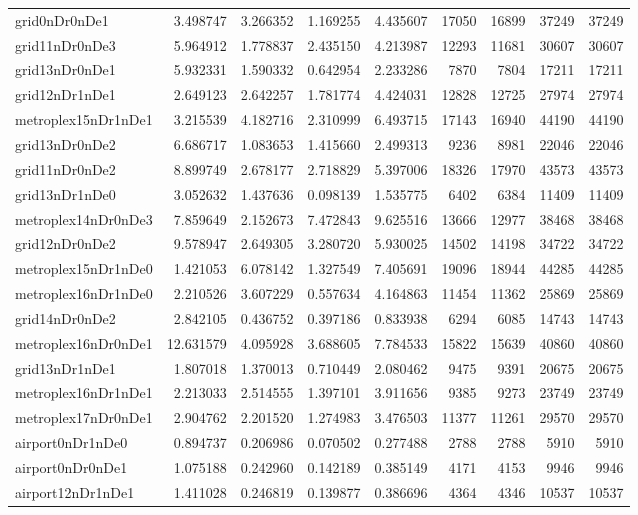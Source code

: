 \begin{longtable}{|l|r|r|r|r|r|r|r|r|}
grid0nDr0nDe1 & 3.498747 & 3.266352 & 1.169255 & 4.435607 & 17050 & 16899 & 37249 & 37249 \\
grid11nDr0nDe3 & 5.964912 & 1.778837 & 2.435150 & 4.213987 & 12293 & 11681 & 30607 & 30607 \\
grid13nDr0nDe1 & 5.932331 & 1.590332 & 0.642954 & 2.233286 & 7870 & 7804 & 17211 & 17211 \\
grid12nDr1nDe1 & 2.649123 & 2.642257 & 1.781774 & 4.424031 & 12828 & 12725 & 27974 & 27974 \\
metroplex15nDr1nDe1 & 3.215539 & 4.182716 & 2.310999 & 6.493715 & 17143 & 16940 & 44190 & 44190 \\
grid13nDr0nDe2 & 6.686717 & 1.083653 & 1.415660 & 2.499313 & 9236 & 8981 & 22046 & 22046 \\
grid11nDr0nDe2 & 8.899749 & 2.678177 & 2.718829 & 5.397006 & 18326 & 17970 & 43573 & 43573 \\
grid13nDr1nDe0 & 3.052632 & 1.437636 & 0.098139 & 1.535775 & 6402 & 6384 & 11409 & 11409 \\
metroplex14nDr0nDe3 & 7.859649 & 2.152673 & 7.472843 & 9.625516 & 13666 & 12977 & 38468 & 38468 \\
grid12nDr0nDe2 & 9.578947 & 2.649305 & 3.280720 & 5.930025 & 14502 & 14198 & 34722 & 34722 \\
metroplex15nDr1nDe0 & 1.421053 & 6.078142 & 1.327549 & 7.405691 & 19096 & 18944 & 44285 & 44285 \\
metroplex16nDr1nDe0 & 2.210526 & 3.607229 & 0.557634 & 4.164863 & 11454 & 11362 & 25869 & 25869 \\
grid14nDr0nDe2 & 2.842105 & 0.436752 & 0.397186 & 0.833938 & 6294 & 6085 & 14743 & 14743 \\
metroplex16nDr0nDe1 & 12.631579 & 4.095928 & 3.688605 & 7.784533 & 15822 & 15639 & 40860 & 40860 \\
grid13nDr1nDe1 & 1.807018 & 1.370013 & 0.710449 & 2.080462 & 9475 & 9391 & 20675 & 20675 \\
metroplex16nDr1nDe1 & 2.213033 & 2.514555 & 1.397101 & 3.911656 & 9385 & 9273 & 23749 & 23749 \\
metroplex17nDr0nDe1 & 2.904762 & 2.201520 & 1.274983 & 3.476503 & 11377 & 11261 & 29570 & 29570 \\
airport0nDr1nDe0 & 0.894737 & 0.206986 & 0.070502 & 0.277488 & 2788 & 2788 & 5910 & 5910 \\
airport0nDr0nDe1 & 1.075188 & 0.242960 & 0.142189 & 0.385149 & 4171 & 4153 & 9946 & 9946 \\
airport12nDr1nDe1 & 1.411028 & 0.246819 & 0.139877 & 0.386696 & 4364 & 4346 & 10537 & 10537 \\

\end{longtable}
